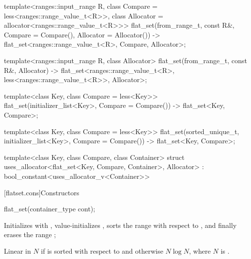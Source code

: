 \begin{addedblock}
\begin{codeblock}
{  template<ranges::input_range R, class Compare = less<ranges::range_value_t<R>>,
          class Allocator = allocator<ranges::range_value_t<R>>>
    flat_set(from_range_t, const R&, Compare = Compare(), Allocator = Allocator())
      -> flat_set<ranges::range_value_t<R>, Compare, Allocator>;

   template<ranges::input_range R, class Allocator>
     flat_set(from_range_t, const R&, Allocator)
       -> flat_set<ranges::range_value_t<R>, less<ranges::range_value_t<R>>, Allocator>;

  template<class Key, class Compare = less<Key>>
    flat_set(initializer_list<Key>, Compare = Compare())
      -> flat_set<Key, Compare>;

  template<class Key, class Compare = less<Key>>
    flat_set(sorted_unique_t, initializer_list<Key>, Compare = Compare())
      -> flat_set<Key, Compare>;

  template<class Key, class Compare, class Container>
    struct uses_allocator<flat_set<Key, Compare, Container>, Allocator>
      : bool_constant<uses_allocator_v<Container>> {}
}
\end{codeblock}

[flatset.cons]{Constructors}

%
\begin{itemdecl}
flat_set(container_type cont);
\end{itemdecl}

\begin{itemdescr}
\pnum
\effects Initializes  with , value-initializes
, sorts the range  with respect to
, and finally erases the range ;

\pnum
\complexity
Linear in $N$ if  is sorted with respect to  and
otherwise $N \log N$, where $N$ is .
\end{itemdescr}


\end{addedblock}
